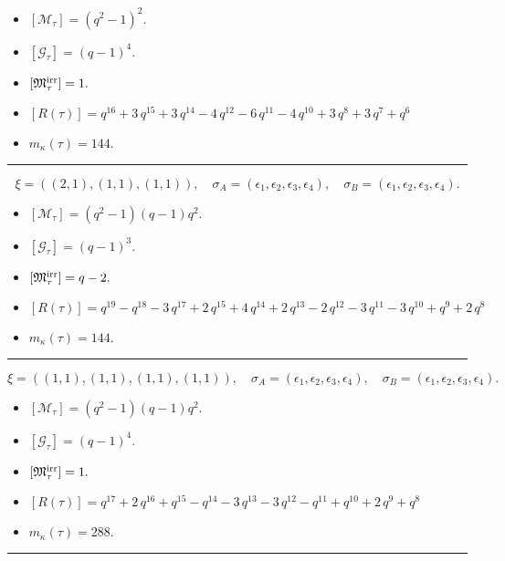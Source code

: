 \documentclass[10pt,a4paper]{amsart}
\begin{document}
\begin{itemize}
 \item $[\mathcal{M}_{\tau}] = {\left(q^{2} - 1\right)}^{2} .$

 \item $[\mathcal{G}_{\tau}] = {\left(q - 1\right)}^{4} .$

 \item $[{\frak M}_{\tau}^{\textrm{irr}}] = 1 .$

 \item $[R(\tau)] = q^{16} + 3 \, q^{15} + 3 \, q^{14} - 4 \, q^{12} - 6 \, q^{11} - 4 \, q^{10} + 3 \, q^{8} + 3 \, q^{7} + q^{6} $

 \item $m_{\kappa}(\tau) = 144 .$

 \end{itemize}
\noindent\rule{8cm}{0.4pt}

$$\xi = ({(2, 1)}, {(1, 1)}, {(1, 1)}),\quad \sigma_A = ({{\epsilon_1, \epsilon_2}}, {{\epsilon_3}}, {{\epsilon_4}}),\quad \sigma_B = ({{\epsilon_1, \epsilon_2}}, {{\epsilon_3}}, {{\epsilon_4}}).$$

\begin{itemize}
 \item $[\mathcal{M}_{\tau}] = {\left(q^{2} - 1\right)} {\left(q - 1\right)} q^{2} .$

 \item $[\mathcal{G}_{\tau}] = {\left(q - 1\right)}^{3} .$

 \item $[{\frak M}_{\tau}^{\textrm{irr}}] = q - 2 .$

 \item $[R(\tau)] = q^{19} - q^{18} - 3 \, q^{17} + 2 \, q^{15} + 4 \, q^{14} + 2 \, q^{13} - 2 \, q^{12} - 3 \, q^{11} - 3 \, q^{10} + q^{9} + 2 \, q^{8} $

 \item $m_{\kappa}(\tau) = 144 .$

 \end{itemize}
\noindent\rule{8cm}{0.4pt}

$$\xi = ({(1, 1), (1, 1)}, {(1, 1)}, {(1, 1)}),\quad \sigma_A = ({{\epsilon_1}, {\epsilon_2}}, {{\epsilon_3}}, {{\epsilon_4}}),\quad \sigma_B = ({{\epsilon_1}, {\epsilon_2}}, {{\epsilon_3}}, {{\epsilon_4}}).$$

\begin{itemize}
 \item $[\mathcal{M}_{\tau}] = {\left(q^{2} - 1\right)} {\left(q - 1\right)} q^{2} .$

 \item $[\mathcal{G}_{\tau}] = {\left(q - 1\right)}^{4} .$

 \item $[{\frak M}_{\tau}^{\textrm{irr}}] = 1 .$

 \item $[R(\tau)] = q^{17} + 2 \, q^{16} + q^{15} - q^{14} - 3 \, q^{13} - 3 \, q^{12} - q^{11} + q^{10} + 2 \, q^{9} + q^{8} $

 \item $m_{\kappa}(\tau) = 288 .$

 \end{itemize}
\noindent\rule{8cm}{0.4pt}
\end{document}
